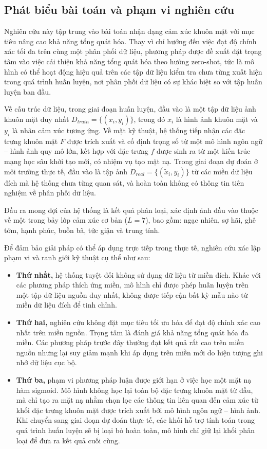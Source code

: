 \subsection{Phát biểu bài toán và phạm vi nghiên cứu}

Nghiên cứu này tập trung vào bài toán nhận dạng cảm xúc khuôn mặt với mục tiêu nâng cao khả năng tổng quát hóa. Thay vì chỉ hướng đến việc đạt độ chính xác tối đa trên cùng một phân phối dữ liệu, phương pháp được đề xuất đặt trọng tâm vào việc cải thiện khả năng tổng quát hóa theo hướng zero-shot, tức là mô hình có thể hoạt động hiệu quả trên các tập dữ liệu kiểm tra chưa từng xuất hiện trong quá trình huấn luyện, nơi phân phối dữ liệu có sự khác biệt so với tập huấn luyện ban đầu.

Về cấu trúc dữ liệu, trong giai đoạn huấn luyện, đầu vào là một tập dữ liệu ảnh khuôn mặt duy nhất $D_{train} = \{(x_i, y_i)\}$, trong đó $x_i$ là hình ảnh khuôn mặt và $y_i$ là nhãn cảm xúc tương ứng. Về mặt kỹ thuật, hệ thống tiếp nhận các đặc trưng khuôn mặt $F$ được trích xuất và cố định trọng số từ một mô hình ngôn ngữ – hình ảnh quy mô lớn, kết hợp với đặc trưng $f$ được sinh ra từ một kiến trúc mạng học sâu khởi tạo mới, có nhiệm vụ tạo mặt nạ. Trong giai đoạn dự đoán ở môi trường thực tế, đầu vào là tập ảnh $D_{real} = \{(\tilde{x}_i, y_i)\}$ từ các miền dữ liệu đích mà hệ thống chưa từng quan sát, và hoàn toàn không có thông tin tiên nghiệm về phân phối dữ liệu.  

Đầu ra mong đợi của hệ thống là kết quả phân loại, xác định ảnh đầu vào thuộc về một trong bảy lớp cảm xúc cơ bản ($L=7$), bao gồm: ngạc nhiên, sợ hãi, ghê tởm, hạnh phúc, buồn bã, tức giận và trung tính.  

Để đảm bảo giải pháp có thể áp dụng trực tiếp trong thực tế, nghiên cứu xác lập phạm vi và ranh giới kỹ thuật cụ thể như sau:  

\begin{itemize}
    \item \textbf{Thứ nhất,} hệ thống tuyệt đối không sử dụng dữ liệu từ miền đích. Khác với các phương pháp thích ứng miền, mô hình chỉ được phép huấn luyện trên một tập dữ liệu nguồn duy nhất, không được tiếp cận bất kỳ mẫu nào từ miền dữ liệu đích để tinh chỉnh.  
    
    \item \textbf{Thứ hai,} nghiên cứu không đặt mục tiêu tối ưu hóa để đạt độ chính xác cao nhất trên miền nguồn. Trọng tâm là đánh giá khả năng tổng quát hóa đa miền. Các phương pháp trước đây thường đạt kết quả rất cao trên miền nguồn nhưng lại suy giảm mạnh khi áp dụng trên miền mới do hiện tượng ghi nhớ dữ liệu cục bộ.  
    
    \item \textbf{Thứ ba,} phạm vi phương pháp luận được giới hạn ở việc học một mặt nạ hàm sigmoid. Mô hình không học lại toàn bộ đặc trưng khuôn mặt từ đầu, mà chỉ tạo ra mặt nạ nhằm chọn lọc các thông tin liên quan đến cảm xúc từ khối đặc trưng khuôn mặt được trích xuất bởi mô hình ngôn ngữ – hình ảnh. Khi chuyển sang giai đoạn dự đoán thực tế, các khối hỗ trợ tính toán trong quá trình huấn luyện sẽ bị loại bỏ hoàn toàn, mô hình chỉ giữ lại khối phân loại để đưa ra kết quả cuối cùng.
\end{itemize}

